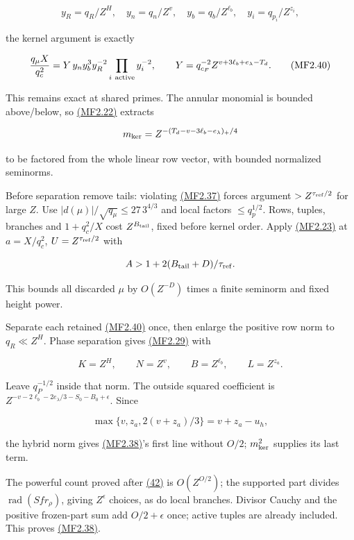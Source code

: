 \[
y_R=q_R/Z^H,\quad y_n=q_n/Z^v,\quad
y_b=q_b/Z^{\ell_b},\quad y_i=q_{p_i}/Z^{z_i},
\]

the kernel argument is exactly

\hypertarget{mf:eq:B2.40}{}

\label{mf:eq:B2.40}

\[
\frac{q_\mu X}{q_c^2}
=Y\,y_ny_b^3y_R^{-2}\prod_{i\ {\rm active}}y_i^{-2},
\qquad
Y=q_{c_F}^{-2}Z^{v+3\ell_b+e_\lambda-T_d}.
\qquad\text{(MF2.40)}
\]

This remains exact at shared primes. The annular monomial is bounded above/below, so \protect\hyperlink{mf:eq:B2.22}{(MF2.22)} extracts

\[
m_{\rm ker}=Z^{-(T_d-v-3\ell_b-e_\lambda)_+/4}
\]

to be factored from the whole linear row vector, with bounded normalized seminorms.

Before separation remove tails: violating \protect\hyperlink{mf:eq:B2.37}{(MF2.37)} forces argument \(>Z^{\tau_{\rm ref}/2}\) for large \(Z\). Use \(|d(\mu)|/\sqrt{q_\mu}\le27\,3^{4/3}\) and local factors \(\le q_p^{1/2}\). Rows, tuples, branches and \(1+q_c^2/X\) cost \(Z^{B_{\rm tail}}\), fixed before kernel order. Apply \protect\hyperlink{mf:eq:B2.23}{(MF2.23)} at \(a=X/q_c^2\), \(U=Z^{\tau_{\rm ref}/2}\) with

\[
A>1+2(B_{\rm tail}+D)/\tau_{\rm ref}.
\]

This bounds all discarded \(\mu\) by \(O(Z^{-D})\) times a finite seminorm and fixed height power.

Separate each retained \protect\hyperlink{mf:eq:B2.40}{(MF2.40)} once, then enlarge the positive row norm to \(q_R\ll Z^H\). Phase separation gives \protect\hyperlink{mf:eq:B2.29}{(MF2.29)} with

\[
K=Z^H,\qquad N=Z^v,\qquad B=Z^{\ell_b},\qquad L=Z^{z_a}.
\]

Leave \(q_P^{-1/2}\) inside that norm. The outside squared coefficient is \(Z^{-v-2\ell_b-2e_\lambda/3-S_0-B_0+\epsilon}\). Since

\[
\max\{v,z_a,2(v+z_a)/3\}=v+z_a-u_h,
\]

the hybrid norm gives \protect\hyperlink{mf:eq:B2.38}{(MF2.38)}'s first line without \(O/2\); \(m_{\rm ker}^2\) supplies its last term.

The powerful count proved after \protect\hyperlink{cf:eq:B.23}{(42)} is \(O(Z^{O/2})\); the supported part divides \(\operatorname{rad}(Sfr_\rho)\), giving \(Z^\epsilon\) choices, as do local branches. Divisor Cauchy and the positive frozen-part sum add \(O/2+\epsilon\) once; active tuples are already included. This proves \protect\hyperlink{mf:eq:B2.38}{(MF2.38)}.


